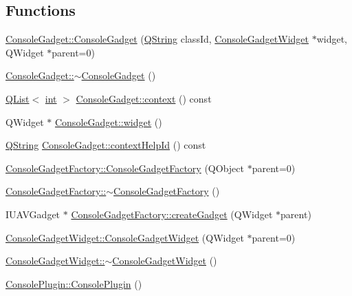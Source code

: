 \subsection*{Functions}
\begin{DoxyCompactItemize}
\item 
\hyperlink{group___console_plugin_ga4c0ebb0d0d98dc2464d1a43c68feec60}{Console\-Gadget\-::\-Console\-Gadget} (\hyperlink{group___u_a_v_objects_plugin_gab9d252f49c333c94a72f97ce3105a32d}{Q\-String} class\-Id, \hyperlink{class_console_gadget_widget}{Console\-Gadget\-Widget} $\ast$widget, Q\-Widget $\ast$parent=0)
\item 
\hyperlink{group___console_plugin_ga8cfb9cc05b03bf8d1ff2fda3befc6326}{Console\-Gadget\-::$\sim$\-Console\-Gadget} ()
\item 
\hyperlink{class_q_list}{Q\-List}$<$ \hyperlink{ioapi_8h_a787fa3cf048117ba7123753c1e74fcd6}{int} $>$ \hyperlink{group___console_plugin_ga0035ad50dabedbce0cb07ecd85ef95f0}{Console\-Gadget\-::context} () const 
\item 
Q\-Widget $\ast$ \hyperlink{group___console_plugin_gaa9fff820073d054b2ab58500206fe54d}{Console\-Gadget\-::widget} ()
\item 
\hyperlink{group___u_a_v_objects_plugin_gab9d252f49c333c94a72f97ce3105a32d}{Q\-String} \hyperlink{group___console_plugin_gad1700fcf695662402ed7faba6ca2a239}{Console\-Gadget\-::context\-Help\-Id} () const 
\item 
\hyperlink{group___console_plugin_ga77777adade86473e7c810b2e0a64e5b0}{Console\-Gadget\-Factory\-::\-Console\-Gadget\-Factory} (Q\-Object $\ast$parent=0)
\item 
\hyperlink{group___console_plugin_ga906d7deb3783cbcb35b88c42eb8be4d8}{Console\-Gadget\-Factory\-::$\sim$\-Console\-Gadget\-Factory} ()
\item 
I\-U\-A\-V\-Gadget $\ast$ \hyperlink{group___console_plugin_gac39d102639ab8db1917e47e48338487b}{Console\-Gadget\-Factory\-::create\-Gadget} (Q\-Widget $\ast$parent)
\item 
\hyperlink{group___console_plugin_gaf36f2dbb51922f2b8cea7297df751bde}{Console\-Gadget\-Widget\-::\-Console\-Gadget\-Widget} (Q\-Widget $\ast$parent=0)
\item 
\hyperlink{group___console_plugin_ga8f28b960cce5aee7f66b35e0fb38fd12}{Console\-Gadget\-Widget\-::$\sim$\-Console\-Gadget\-Widget} ()
\item 
\hyperlink{group___console_plugin_ga1200bf1b46402c602901b2444d697eb9}{Console\-Plugin\-::\-Console\-Plugin} ()
\item 

\end{DoxyCompactItemize}
